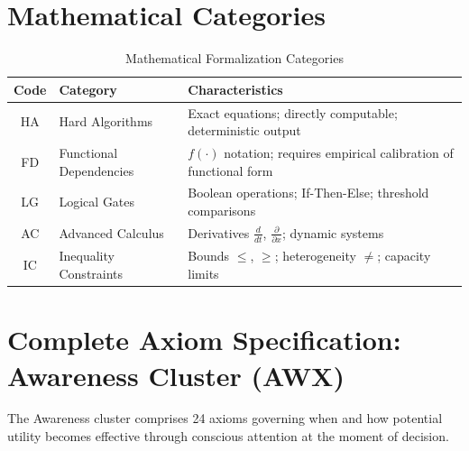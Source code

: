 \section{Mathematical Categories}
\label{sec:categories}

\begin{table}[htbp]
\centering
\caption{Mathematical Formalization Categories}
\label{tab:categories}
\begin{tabular}{clp{8cm}}
\toprule
\textbf{Code} & \textbf{Category} & \textbf{Characteristics} \\
\midrule
HA & Hard Algorithms & Exact equations; directly computable; deterministic output \\
FD & Functional Dependencies & $f(\cdot)$ notation; requires empirical calibration of functional form \\
LG & Logical Gates & Boolean operations; If-Then-Else; threshold comparisons \\
AC & Advanced Calculus & Derivatives $\frac{d}{dt}$, $\frac{\partial}{\partial x}$; dynamic systems \\
IC & Inequality Constraints & Bounds $\leq$, $\geq$; heterogeneity $\neq$; capacity limits \\
\bottomrule
\end{tabular}
\end{table}

\section{Complete Axiom Specification: Awareness Cluster (AWX)}
\label{sec:awareness-axioms}

The Awareness cluster comprises 24 axioms governing when and how potential utility becomes effective through conscious attention at the moment of decision.


